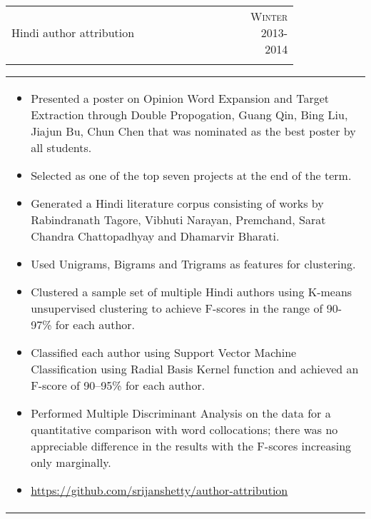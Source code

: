 \documentclass[a4paper,10pt]{article} %
\newcommand{\lproject}[4]{
    \begin{tabular}{p{0.80\linewidth}r}
        \textcolor{NavyBlue}{#2} & \multicolumn{1}{m{4cm}}{\raggedleft \textsc{#1}}\\
        #3
    \end{tabular}
    \begin{tabular}{p{\linewidth}}
    \vspace{-0.3cm}
        \footnotesize{#4}
    \end{tabular}
    \vspace{-0.5cm}
}
\begin{document}
\lproject {Winter 2013-2014}
          {Hindi author attribution}
          {\textsc{\raggedright Artificial Intelligence}, Professor Amitabha Mukherjee}
          {
             \begin{itemize}[leftmargin=0.5cm]
                 \item Presented a poster on Opinion Word Expansion and Target Extraction through Double Propogation, Guang Qin,
                     Bing Liu, Jiajun Bu, Chun Chen that was nominated as the best poster by all students.
                 \item Selected as one of the top seven projects at the end of the term.
                 \item Generated a Hindi literature corpus consisting of works by Rabindranath Tagore,
                     Vibhuti Narayan, Premchand, Sarat Chandra Chattopadhyay and Dhamarvir Bharati.
                 \item Used Unigrams, Bigrams and Trigrams as features for clustering.
                 \item Clustered a sample set of multiple Hindi authors using K-means unsupervised clustering to achieve
                     F-scores in the range of 90-97\% for each author.
                 \item Classified each author using Support Vector Machine Classification using Radial Basis Kernel function
                     and achieved an F-score of 90--95\% for each author.
                 \item Performed Multiple Discriminant Analysis on the data for a quantitative comparison with word
                     collocations; there was no appreciable difference in the results with the F-scores increasing only
                     marginally.
                 \item \href{https://github.com/srijanshetty/author-attribution}{https://github.com/srijanshetty/author-attribution}
             \end{itemize}
         }
\end{document}
